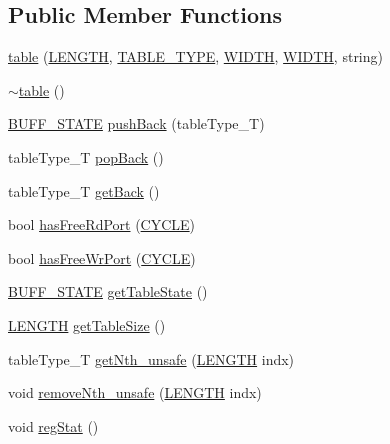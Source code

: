 \subsection*{Public Member Functions}
\begin{DoxyCompactItemize}
\item 
\hyperlink{classtable_a5b99bb95a41d31c95bcf2c91c784f981}{table} (\hyperlink{global_2global_8h_ad7ec63c69447a2b630929c8e0197860d}{LENGTH}, \hyperlink{table_8h_ae42c42cf2da8a8d43c157d91ad4f3158}{TABLE\_\-TYPE}, \hyperlink{global_2global_8h_a6fa2e24b8a418fa215e183264cbea3aa}{WIDTH}, \hyperlink{global_2global_8h_a6fa2e24b8a418fa215e183264cbea3aa}{WIDTH}, string)
\item 
\hyperlink{classtable_a2d08b3fd77985dc4dc610de35946a293}{$\sim$table} ()
\item 
\hyperlink{global_2global_8h_a8bd4ea2582a6025c1cfe99bf9947489c}{BUFF\_\-STATE} \hyperlink{classtable_a8810ab4eeba365c36687d4c6c02fe1f6}{pushBack} (tableType\_\-T)
\item 
tableType\_\-T \hyperlink{classtable_a2fbaa1bd5450556efff7dddd33e5b6d1}{popBack} ()
\item 
tableType\_\-T \hyperlink{classtable_a9a0482a7594596a539e815bbe9c6aa7b}{getBack} ()
\item 
bool \hyperlink{classtable_a8c3b8032622fa8c6e85e9a4d5ded1a80}{hasFreeRdPort} (\hyperlink{global_2global_8h_a7e19a550ec11d1ed921deb20c22efb5b}{CYCLE})
\item 
bool \hyperlink{classtable_a4da7f6326c21da45dbed8d618c3aabce}{hasFreeWrPort} (\hyperlink{global_2global_8h_a7e19a550ec11d1ed921deb20c22efb5b}{CYCLE})
\item 
\hyperlink{global_2global_8h_a8bd4ea2582a6025c1cfe99bf9947489c}{BUFF\_\-STATE} \hyperlink{classtable_abab8f70b8b32bb7342f5107edb328d18}{getTableState} ()
\item 
\hyperlink{global_2global_8h_ad7ec63c69447a2b630929c8e0197860d}{LENGTH} \hyperlink{classtable_af9c07419ae48bd029f03a9e7ca29c43f}{getTableSize} ()
\item 
tableType\_\-T \hyperlink{classtable_a6876501119e77aa58a373c1f12c70b8d}{getNth\_\-unsafe} (\hyperlink{global_2global_8h_ad7ec63c69447a2b630929c8e0197860d}{LENGTH} indx)
\item 
void \hyperlink{classtable_a55389eaae41800d77cacc97c563491f0}{removeNth\_\-unsafe} (\hyperlink{global_2global_8h_ad7ec63c69447a2b630929c8e0197860d}{LENGTH} indx)
\item 
void \hyperlink{classtable_af252520f4025cbc80e7bff8d9b811ba7}{regStat} ()
\end{DoxyCompactItemize}

